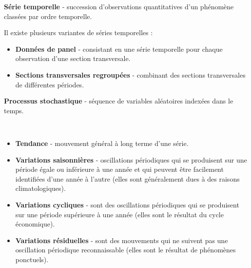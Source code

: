 
	 \begin{f}[Définitions ]

\textbf{Série temporelle} - succession d'observations quantitatives d'un phénomène classées par ordre temporelle.
	
Il existe plusieurs variantes de séries temporelles :
		\begin{itemize}[leftmargin=*]	
		\item \textbf{Données de panel} - consistant en une série temporelle pour chaque observation d'une section transversale.
		\item \textbf{Sections transversales regroupées} - combinant des sections transversales de différentes périodes.
	\end{itemize}	
%	
		 \textbf{Processus stochastique} - séquence de variables aléatoires indexées dans le temps.
	\end{f}    
	
	\begin{f}{\ }

	\begin{itemize}[leftmargin=*]
		\item \textbf{Tendance} - mouvement général à long terme d'une série.
		\item \textbf{Variations saisonnières} - oscillations périodiques qui se produisent sur une période égale ou inférieure à une année et qui peuvent être facilement identifiées d'une année à l'autre (elles sont généralement dues à des raisons climatologiques).
		\item \textbf{Variations cycliques} - sont des oscillations périodiques qui se produisent sur une période supérieure à une année (elles sont le résultat du cycle économique).
		\item \textbf{Variations résiduelles} - sont des mouvements qui ne suivent pas une oscillation périodique reconnaissable (elles sont le résultat de phénomènes ponctuels).
	\end{itemize}
	
	\end{f}    
	

